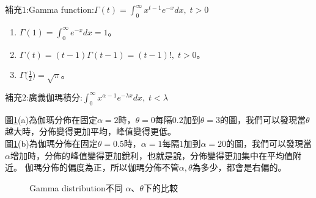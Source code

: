 \documentclass[12pt, a4paper]{article}
\begin{document}
補充\;$1$\;:\;Gamma function\;:\;$\Gamma (t)=\int_{0}^{\infty}x^{t-1} e^{-x}dx,\;t>0$
\begin{enumerate}
\item $\Gamma (1)=\int_{0}^{\infty}e^{-x} dx=1$。
\item $\Gamma (t)=(t-1)\Gamma (t-1)=(t-1)!, \;t>0$。
\item $\Gamma \big(\frac{1}{2}\big)=\sqrt{\pi}$。
\end{enumerate}
補充\;$2$\;:廣義伽瑪積分\;:\;$\int_{0}^{\infty} x^{\alpha-1}e^{-\lambda x}dx,\;t<\lambda$

圖\;\ref{fig:parallel3_7}\;(a)\;為伽瑪分佈在固定\;$\alpha=2$\;時，\;$\theta=0$\;每隔\;$0.2$\;加到\;$\theta=3$\;的圖，我們可以發現當\;$\theta$\;越大時，分佈變得更加平均，峰值變得更低。\\
圖\;\ref{fig:parallel3_7}\;(b)\;為伽瑪分佈在固定\;$\theta=0.5$\;時，\;$\alpha=1$\;每隔\;$1$\;加到\;$\alpha=20$\;的圖，我們可以發現當\;$\alpha$\;增加時，分佈的峰值變得更加銳利，也就是說，分佈變得更加集中在平均值附近。
伽瑪分佈的偏度為正，所以伽瑪分佈不管\;$\alpha, \theta$\;為多少，都會是右偏的。

\begin{figure}[H]
\centering
{}
\caption{Gamma distribution不同 $\alpha$、$\theta$下的比較}
\label{fig:parallel3_7}
\end{figure}
\end{document}
